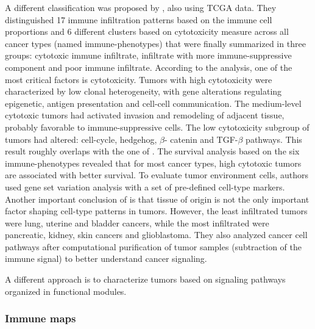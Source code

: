 \documentclass[12pt,]{book}
\theoremstyle{definition}
\theoremstyle{definition}
\theoremstyle{definition}
\theoremstyle{remark}
\begin{document}
A different classification was proposed by \citet{Tamborero2018}, also
using TCGA data. They distinguished 17 immune infiltration patterns
based on the immune cell proportions and 6 different clusters based on
cytotoxicity measure across all cancer types (named immune-phenotypes)
that were finally summarized in three groups: cytotoxic immune
infiltrate, infiltrate with more immune-suppressive component and poor
immune infiltrate. According to the analysis, one of the most critical
factors is cytotoxicity. Tumors with high cytotoxicity were
characterized by low clonal heterogeneity, with gene alterations
regulating epigenetic, antigen presentation and cell-cell communication.
The medium-level cytotoxic tumors had activated invasion and remodeling
of adjacent tissue, probably favorable to immune-suppressive cells. The
low cytotoxicity subgroup of tumors had altered: cell-cycle, hedgehog,
\(\beta\)- catenin and TGF-\(\beta\) pathways. This result roughly
overlaps with the one of \citet{Thorsson2018}. The survival analysis
based on the six immune-phenotypes revealed that for most cancer types,
high cytotoxic tumors are associated with better survival. To evaluate
tumor environment cells, authors used gene set variation analysis
\citep{Hanzelmann2013} with a set of pre-defined cell-type markers.
Another important conclusion of \citet{Tamborero2018} is that tissue of
origin is not the only important factor shaping cell-type patterns in
tumors. However, the least infiltrated tumors were lung, uterine and
bladder cancers, while the most infiltrated were pancreatic, kidney,
skin cancers and glioblastoma. They also analyzed cancer cell pathways
after computational purification of tumor samples (subtraction of the
immune signal) to better understand cancer signaling.

A different approach is to characterize tumors based on signaling
pathways organized in functional modules.

\hypertarget{immune-maps}{%
\subsubsection{Immune maps}\label{immune-maps}}
\end{document}
